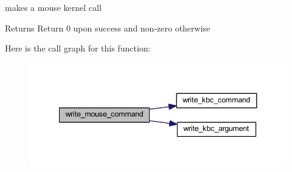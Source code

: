 makes a mouse kernel call 

\begin{DoxyReturn}{Returns}
Return 0 upon success and non-\/zero otherwise 
\end{DoxyReturn}
Here is the call graph for this function\+:
\nopagebreak
\begin{figure}[H]
\begin{center}
\leavevmode
\includegraphics[width=341pt]{group__mouse_ga26d0989b9acaa8dea02b2f0639916c0e_cgraph}
\end{center}
\end{figure}
